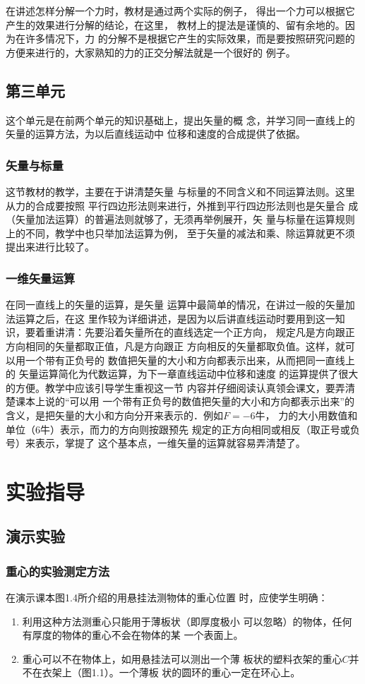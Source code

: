 在讲述怎样分解一个力时，教材是通过两个实际的例子，
得出一个力可以根据它产生的效果进行分解的结论，在这里，
教材上的提法是谨慎的、留有余地的。因为在许多情况下，力
的分解不是根据它产生的实际效果，而是要按照研究问题的
方便来进行的，大家熟知的力的正交分解法就是一个很好的
例子。

\subsection{第三单元}
这个单元是在前两个单元的知识基础上，提出矢量的概
念，并学习同一直线上的矢量的运算方法，为以后直线运动中
位移和速度的合成提供了依据。

\subsubsection{矢量与标量} 
这节教材的教学，主要在于讲清楚矢量
与标量的不同含义和不同运算法则。这里从力的合成要按照
平行四边形法则来进行，外推到平行四边形法则也是矢量合
成（矢量加法运算）的普遍法则就够了，无须再举例展开，矢
量与标量在运算规则上的不同，教学中也只举加法运算为例，
至于矢量的减法和乘、除运算就更不须提出来进行比较了。

\subsubsection{一维矢量运算}  在同一直线上的矢量的运算，是矢量
运算中最简单的情况，在讲过一般的矢量加法运算之后，在这
里作较为详细讲述，是因为以后讲直线运动时要用到这一知
识，要着重讲清：先要沿着矢量所在的直线选定一个正方向，
规定凡是方向跟正方向相同的矢量都取正值，凡是方向跟正
方向相反的矢量都取负值。这样，就可以用一个带有正负号的
数值把矢量的大小和方向都表示出来，从而把同一直线上的
矢量运算简化为代数运算，为下一章直线运动中位移和速度
的运算提供了很大的方便。教学中应该引导学生重视这一节
内容并仔细阅读认真领会课文，要弄清楚课本上说的“可以用
一个带有正负号的数值把矢量的大小和方向都表示出来”的
含义，是把矢量的大小和方向分开来表示的．例如$F=-6$牛，
力的大小用数值和单位（6牛）表示，而力的方向则按跟预先
规定的正方向相同或相反（取正号或负号）来表示，掌提了
这个基本点，一维矢量的运算就容易弄清楚了。

\section{实验指导}
\subsection{演示实验}
\subsubsection{重心的实验测定方法}
在演示课本图1.4所介绍的用悬挂法测物体的重心位置
时，应使学生明确：
\begin{enumerate}
\item 利用这种方法测重心只能用于薄板状（即厚度极小
可以忽略）的物体，任何有厚度的物体的重心不会在物体的某
一个表面上。
\item 重心可以不在物体上，如用悬挂法可以测出一个薄
板状的塑料衣架的重心$C$并不在衣架上（图1.1）。一个薄板
状的圆环的重心一定在环心上。
\end{enumerate}

